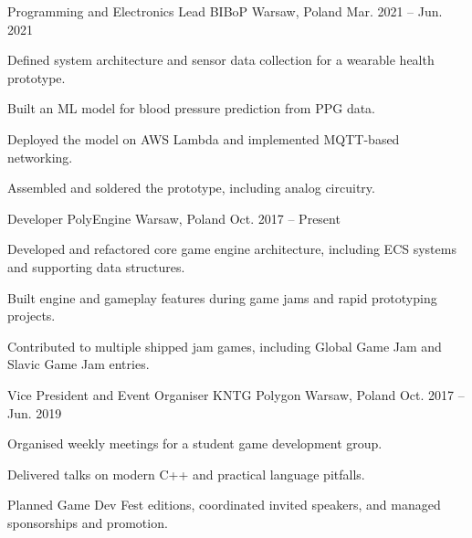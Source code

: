 
\begin{cventries}

  \cventry
    {Programming and Electronics Lead}
    {BIBoP}
    {Warsaw, Poland}
    {Mar. 2021 -- Jun. 2021}
    {
      \begin{cvitems}
        \item {Defined system architecture and sensor data collection for a wearable health prototype.}
        \item {Built an ML model for blood pressure prediction from PPG data.}
        \item {Deployed the model on AWS Lambda and implemented MQTT-based networking.}
        \item {Assembled and soldered the prototype, including analog circuitry.}
      \end{cvitems}
    }

  \cventry
    {Developer}
    {PolyEngine}
    {Warsaw, Poland}
    {Oct. 2017 -- Present}
    {
      \begin{cvitems}
        \item {Developed and refactored core game engine architecture, including ECS systems and supporting data structures.}
        \item {Built engine and gameplay features during game jams and rapid prototyping projects.}
        \item {Contributed to multiple shipped jam games, including Global Game Jam and Slavic Game Jam entries.}
      \end{cvitems}
    }

  \cventry
    {Vice President and Event Organiser}
    {KNTG Polygon}
    {Warsaw, Poland}
    {Oct. 2017 -- Jun. 2019}
    {
      \begin{cvitems}
        \item {Organised weekly meetings for a student game development group.}
        \item {Delivered talks on modern C++ and practical language pitfalls.}
        \item {Planned Game Dev Fest editions, coordinated invited speakers, and managed sponsorships and promotion.}
      \end{cvitems}
    }

\end{cventries}
